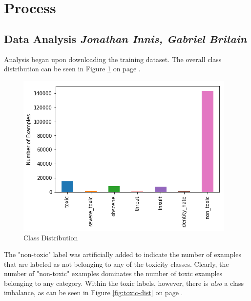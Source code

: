 \documentclass{article}
\begin{document}
\section{Process}{
  \subsection{Data Analysis \textit{Jonathan Innis, Gabriel Britain}}{
	  Analysis began upon downloading the training dataset. The overall class
	  distribution can be seen in Figure \ref{fig:class-dist} on page
	  \pageref{fig:class-dist}.
	  \begin{figure}[h]
		  \centering
		  \includegraphics[width=\textwidth]{class-distribution.png}
		  \caption{Class Distribution}
		  \label{fig:class-dist}
	  \end{figure}
	  The "non-toxic" label was artificially added to indicate the number of
	  examples that are labeled as not belonging to any of the toxicity classes.
	  Clearly, the number of "non-toxic" examples dominates the number of toxic
	  examples belonging to any category. Within the toxic labels, however, there
	  is \textit{also} a class imbalance, as can be seen in Figure
	  \ref{fig:toxic-dist} on page \pageref{fig:toxic-dist}.

}}
\end{document}
